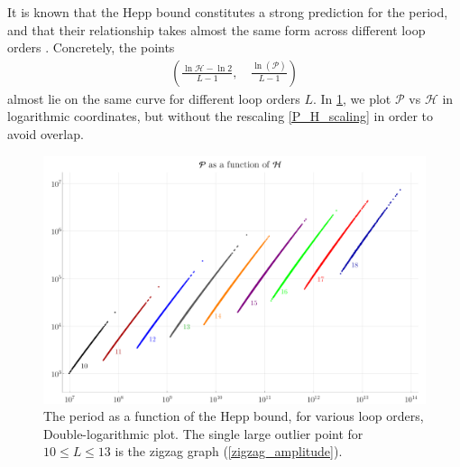 \documentclass[12pt,a4paper]{article}
\newcommand{\period}{\mathcal P}
\renewcommand{\|}{\rule[-0.4ex]{0.2ex}{1.2em}}
\begin{document}
It is known that the Hepp bound constitutes a strong prediction for the period, and that their relationship takes almost the same form across different loop orders \cite{panzer_hepp_2022}. Concretely, the points
\begin{align}\label{P_H_scaling}
\left(  \frac{\ln \mathcal H - \ln 2}{L-1}, \quad \frac{\ln (\period)}{L-1} \right)  
\end{align}
almost lie on the same curve for different loop orders $L$.  
In \cref{P_H}, we plot $\period$ vs $\mathcal H$  in logarithmic coordinates, but without the rescaling \cref{P_H_scaling} in order to avoid overlap.


\begin{figure}[h]
	\centering
	\includegraphics[width=.85\linewidth]{P_H}
	\caption{The period as a function of the Hepp bound, for various loop orders, Double-logarithmic plot.   The single large  outlier point for $10 \leq L \leq 13$ is the zigzag graph  (\cref{zigzag_amplitude}). }
	\label{P_H}
\end{figure}
\end{document}
